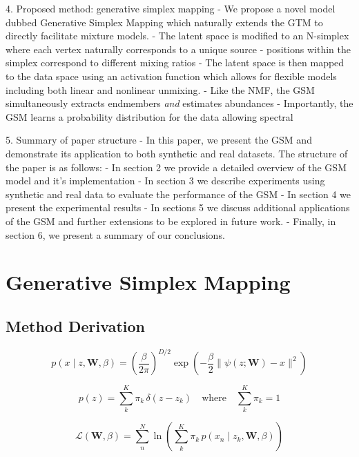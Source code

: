 \documentclass[remotesensing,article,submit,pdftex,moreauthors]{Definitions/mdpi}
\begin{document}
4. Proposed method: generative simplex mapping
- We propose a novel model dubbed Generative Simplex Mapping which naturally extends the GTM to directly facilitate mixture models. 
- The latent space is modified to an N-simplex where each vertex naturally corresponds to a unique source
- positions within the simplex correspond to different mixing ratios
- The latent space is then mapped to the data space using an activation function which allows for flexible models including both linear and nonlinear unmixing. 
- Like the NMF, the GSM simultaneously extracts endmembers \textit{and} estimates abundances
- Importantly, the GSM learns a probability distribution for the data allowing spectral 

5. Summary of paper structure
- In this paper, we present the GSM and demonstrate its application to both synthetic and real datasets. The structure of the paper is as follows: 
- In section 2 we provide a detailed overview of the GSM model and it's implementation
- In section 3 we describe experiments using synthetic and real data to evaluate the performance of the GSM
- In section 4 we present the experimental results
- In sections 5 we discuss additional applications of the GSM and further extensions to be explored in future work. 
- Finally, in section 6, we present a summary of our conclusions.

\newpage

\section{Generative Simplex Mapping}
\subsection{Method Derivation}

\begin{equation}\label{eqn:data-space-distribution}
    p(x \mid z, \mathbf{W}, \beta) = \left(\frac{\beta}{2\pi} \right)^{D/2}\exp\left( -\frac{\beta}{2}\lVert \psi(z; \mathbf{W}) - x \rVert^2 \right)
\end{equation}

\begin{equation}\label{eqn:latent-distribution}
    p(z) = \sum\limits_k^K \pi_k \, \delta(z - z_k) \quad\text{where}\quad  \sum_k^K\pi_k = 1
\end{equation}

\begin{equation}\label{eqn:llh}
    \mathcal{L}(\mathbf{W}, \beta) = \sum\limits_n^N \ln \left( \sum\limits_k^K \pi_k \, p(x_n \mid z_k, \mathbf{W}, \beta) \right)
\end{equation}
\end{document}
